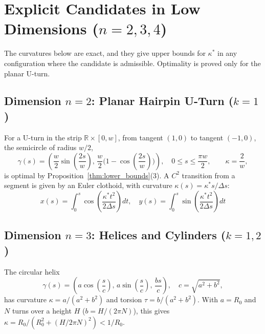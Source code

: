 \documentclass[11pt,reqno]{amsart}
\theoremstyle{definition}
\providecommand{\R}{\mathbb{R}}
\numberwithin{equation}{section}
\providecommand{\R}{\mathbb{R}}
\begin{document}
\section[Explicit Candidates in Low Dimensions]{Explicit Candidates in Low Dimensions \texorpdfstring{($n=2, 3, 4$)}{(n=2, 3, 4)}}
\label{sec:examples}

The curvatures below are exact, and they give upper bounds for $\kappa^*$ in any configuration where the candidate is admissible. Optimality is proved only for the planar U-turn.

\subsection{Dimension \texorpdfstring{$n=2$}{n=2}: Planar Hairpin U-Turn \texorpdfstring{($k=1$)}{(k=1)}}
For a U-turn in the strip $\R \times [0,w]$, from tangent $(1,0)$ to tangent $(-1,0)$, the semicircle of radius $w/2$,
\begin{equation}
\gamma(s) = \left( \frac{w}{2} \sin\left(\frac{2s}{w}\right), \, \frac{w}{2}\Big(1 - \cos\left(\frac{2s}{w}\right)\Big) \right), \quad 0 \le s \le \frac{\pi w}{2}, \qquad \kappa = \frac{2}{w},
\end{equation}
is optimal by Proposition~\ref{thm:lower_bounds}(3). A $C^2$ transition from a segment is given by an Euler clothoid, with curvature $\kappa(s) = \kappa^* s/\Delta s$:
\begin{equation}
x(s) = \int_0^s \cos\left(\frac{\kappa^* t^2}{2 \Delta s}\right) dt, \quad y(s) = \int_0^s \sin\left(\frac{\kappa^* t^2}{2 \Delta s}\right) dt
\end{equation}

\subsection{Dimension \texorpdfstring{$n=3$}{n=3}: Helices and Cylinders \texorpdfstring{($k=1, 2$)}{(k=1, 2)}}
The circular helix
\begin{equation}
\gamma(s) = \left( a \cos\left(\frac{s}{c}\right), \, a \sin\left(\frac{s}{c}\right), \, \frac{b s}{c} \right), \quad c = \sqrt{a^2 + b^2},
\end{equation}
has curvature $\kappa = a/(a^2+b^2)$ and torsion $\tau = b/(a^2+b^2)$. With $a = R_0$ and $N$ turns over a height $H$ ($b = H/(2\pi N)$), this gives $\kappa = R_0/(R_0^2 + (H/2\pi N)^2) < 1/R_0$.
\end{document}
